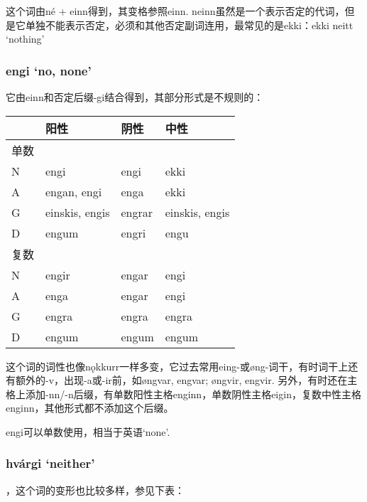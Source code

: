 这个词由né + einn得到，其变格参照einn. neinn虽然是一个表示否定的代词，但是它单独不能表示否定，必须和其他否定副词连用，最常见的是ekki：ekki neitt `nothing'

\subsubsection{engi `no, none‌'}

它由einn和否定后缀-gi结合得到，其部分形式是不规则的：

\begin{longtable}{llll}
    \toprule
         & 阳性           & 阴性   & 中性           \\
    \midrule
    \endhead
    \bottomrule
    \endfoot
    单数 &                &        &                \\
    N    & engi           & engi   & ekki           \\
    A    & engan, engi    & enga   & ekki           \\
    G    & einskis, engis & engrar & einskis, engis \\
    D    & engum          & engri  & engu           \\
    复数 &                &        &                \\
    N    & engir          & engar  & engi           \\
    A    & enga           & engar  & engi           \\
    G    & engra          & engra  & engra          \\
    D    & engum          & engum  & engum          \\
\end{longtable}

这个词的词性也像nǫkkurr一样多变，它过去常用eing-或øng-词干，有时词干上还有额外的-v，出现-a或-ir前，如øngvar, engvar; øngvir, engvir. 另外，有时还在主格上添加-nn/-n后缀，有单数阳性主格enginn，单数阴性主格eigin，复数中性主格enginn，其他形式都不添加这个后缀。

engi可以单数使用，相当于英语`none'.

\subsubsection{hvárgi `neither'}，这个词的变形也比较多样，参见下表：

